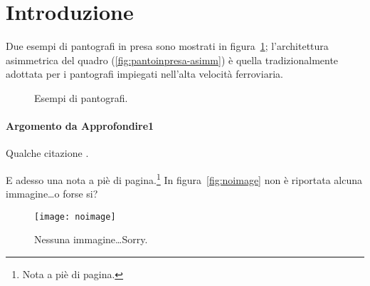 %
%
\cleardoublepage
%
%
%
\chapter*{Introduzione}
%
%
\label{cap:introduzione}
%
%
Due esempi di pantografi in presa sono mostrati in figura~\ref{fig:pantoinpresa}; l'architettura asimmetrica del quadro (\ref{fig:pantoinpresa-asimm}) è quella tradizionalmente adottata per i pantografi impiegati nell'alta velocità ferroviaria.
%
%
\begin{figure}
%
\centering
%
\quad
%
%
\caption{Esempi di pantografi.}
%
\label{fig:pantoinpresa}
%
\end{figure}
%
%
\subsubsection{Argomento da Approfondire1}
%
Qualche citazione \parencite{collina:2002:numerical-simulation-of-pantograph-overhead,comini:2008:fondamenti-di-termofluidodinamica-computazionale}.
%
\lipsum[1-3]
%

\bigskip

E adesso una nota a piè di pagina.\footnote{Nota a piè di pagina.}
In figura~\vref{fig:noimage} non è riportata alcuna immagine\dots o forse si?
%
%
\begin{figure}
%
\centering
%
\texttt{[image: noimage]}
%
\caption{Nessuna immagine\dots Sorry.}
%
\label{fig:noimage}
%
\end{figure}
%
%
